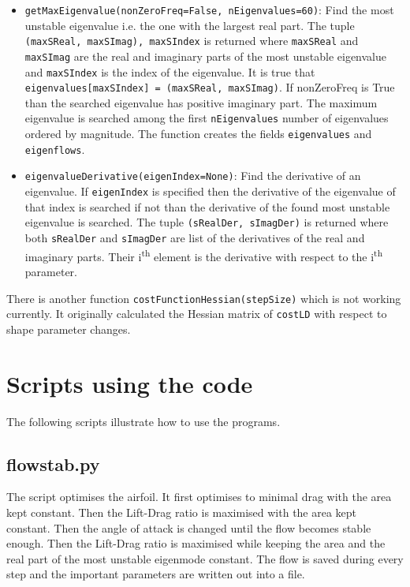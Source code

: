 \documentclass[12pt, a4paper]{article}
\begin{document}
\begin{itemize}
            \item \texttt{getMaxEigenvalue(nonZeroFreq=False, nEigenvalues=60)}: Find the most unstable eigenvalue i.e. the one with the largest real part. The tuple \texttt{(maxSReal, maxSImag), maxSIndex} is returned where \texttt{maxSReal} and \texttt{maxSImag} are the real and imaginary parts of the most unstable eigenvalue and \texttt{maxSIndex} is the index of the eigenvalue. It is true that \texttt{eigenvalues[maxSIndex] = (maxSReal, maxSImag)}. If nonZeroFreq is True than the searched eigenvalue has positive imaginary part. The maximum eigenvalue is searched among the first \texttt{nEigenvalues} number of eigenvalues ordered by magnitude. The function creates the fields \texttt{eigenvalues} and \texttt{eigenflows}.
            \item \texttt{eigenvalueDerivative(eigenIndex=None)}: Find the derivative of an eigenvalue. If \texttt{eigenIndex} is specified then the derivative of the eigenvalue of that index is searched if not than the derivative of the found most unstable eigenvalue is searched. The tuple \texttt{(sRealDer, sImagDer)} is returned where both \texttt{sRealDer} and \texttt{sImagDer} are list of the derivatives of the real and imaginary parts. Their i\textsuperscript{th} element is the derivative with respect to the i\textsuperscript{th} parameter.
        \end{itemize}
        There is another function \texttt{costFunctionHessian(stepSize)} which is not working currently. It originally calculated the Hessian matrix of \texttt{costLD} with respect to shape parameter changes.
    \section{Scripts using the code}
        The following scripts illustrate how to use the programs.
        \subsection{flow\textunderscore stab.py}
            The script optimises the airfoil. It first optimises to minimal drag with the area kept constant. Then the Lift-Drag ratio is maximised with the area kept constant. Then the angle of attack is changed until the flow becomes stable enough. Then the Lift-Drag ratio is maximised while keeping the area and the real part of the most unstable eigenmode constant. The flow is saved during every step and the important parameters are written out into a file.
\end{document}
